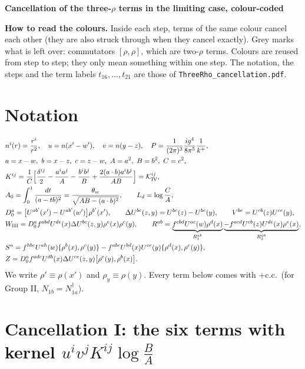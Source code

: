\documentclass[10pt]{article}
\newcommand{\Gr}[1]{{\color{cX}#1}}
\begin{document}
\begin{center}{\large\bf Cancellation of the three-$\rho$ terms in the limiting case, colour-coded}\end{center}

\noindent\textbf{How to read the colours.} Inside each step, terms of the same colour cancel each other (they are also struck through when they cancel exactly). \Gr{Grey} marks what is left over: commutators $[\rho,\rho]$, which are two-$\rho$ terms. Colours are reused from step to step; they only mean something within one step. The notation, the steps and the term labels $t_{16},\dots,t_{21}$ are those of \texttt{ThreeRho\_cancellation.pdf}.

\section*{Notation}
\begin{align}
&n^{i}(r)=\frac{r^{i}}{r^{2}},\quad u=n(x'-w'),\quad v=n(y-z),\quad P=\frac{1}{(2\pi)^{3}}\frac{ig^{4}}{8\pi^{5}}\frac{1}{k^{+}},\notag\\&a=x-w,\ b=x-z,\ c=z-w,\ A=a^{2},\ B=b^{2},\ C=c^{2},\notag\\
&K^{ij}=\frac{1}{C}\Big[\frac{\delta^{ij}}{2}-\frac{a^{i}a^{j}}{A}-\frac{b^{i}b^{j}}{B}+\frac{2(a\cdot b)a^{i}b^{j}}{AB}\Big]=\mathcal K^{ij}_{\rm IV},\notag\\&A_{0}=\int_{0}^{1}\frac{dt}{(a-tb)^{2}}=\frac{\theta_{w}}{\sqrt{AB-(a\cdot b)^{2}}},\qquad L_{d}=\log\frac{C}{A},\notag\\
&D_{0}^{a}=\big[U^{ab'}(x')-U^{ab'}(w')\big]\rho^{b'}(x'),\qquad \Delta U^{bc}(z,y)=U^{bc}(z)-U^{bc}(y),\qquad V^{be}=U^{cb}(z)U^{ce}(y),\notag\\
&W_{\rm III}=D_{0}^{a}f^{abd}U^{de}(x)\Delta U^{bc}(z,y)\rho^{e}(x)\rho^{c}(y),\qquad R^{ab}=\underbrace{f^{cbd}U^{ac}(w)\rho^{d}(x)}_{R_{1}^{ab}}\underbrace{-f^{acd}U^{cb}(z)U^{de}(x)\rho^{e}(x)}_{R_{2}^{ab}},\notag\\
&S^{a}=f^{hbc}U^{ah}(w)\{\rho^{b}(x),\rho^{c}(y)\}-f^{abc}U^{bd}(x)U^{ce}(y)\{\rho^{d}(x),\rho^{e}(y)\},\notag\\
&Z=D_{0}^{a}f^{adc}U^{db}(x)\Delta U^{ce}(z,y)\big[\rho^{e}(y),\rho^{b}(x)\big].
\end{align}
We write $\rho'\equiv\rho(x')$ and $\rho_{y}\equiv\rho(y)$. Every term below comes with $+$c.c.\ (for Group II, $N_{1b}=N_{1a}^{\dagger}$).

\section{Cancellation I: the six terms with kernel $u^{i}v^{j}K^{ij}\log\frac{B}{A}$}
\end{document}
